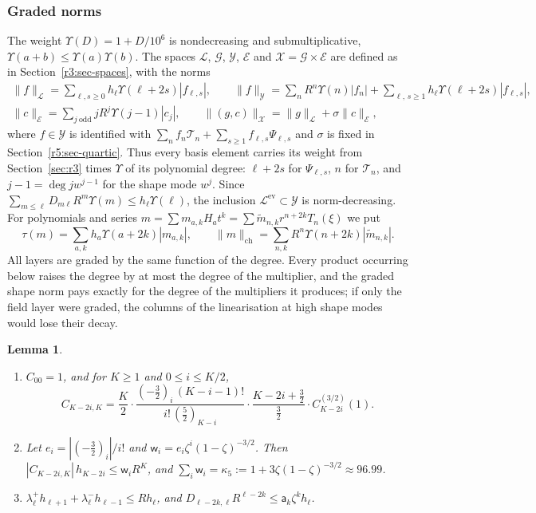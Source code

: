 \documentclass[11pt]{amsart}
\newtheorem{lemma}[theorem]{Lemma}
\theoremstyle{definition}
\theoremstyle{remark}
\numberwithin{equation}{section}
\newcommand{\Gc}{\mathcal{G}}
\newcommand{\nrm}[1]{\lVert #1\rVert}
\begin{document}
\subsubsection*{Graded norms}
The weight $\Upsilon(D)=1+D/10^6$ is nondecreasing and submultiplicative, $\Upsilon(a+b)\leq\Upsilon(a)\Upsilon(b)$. The spaces $\mathcal L$, $\Gc$, $\mathcal Y$, $\mathcal E$ and $\mathcal X=\Gc\times\mathcal E$ are defined as in Section~\ref{r3:sec-spaces}, with the norms
\begin{gather*}
\nrm f_{\mathcal L}=\sum_{\ell,s\geq0}h_\ell\Upsilon(\ell+2s)|f_{\ell,s}|,\qquad\nrm f_{\mathcal Y}=\sum_nR^n\Upsilon(n)|f_n|+\sum_{\ell,\,s\geq1}h_\ell\Upsilon(\ell+2s)|f_{\ell,s}|,\\
\nrm c_{\mathcal E}=\sum_{j\ \mathrm{odd}}jR^j\Upsilon(j-1)|c_j|,\qquad\nrm{(g,c)}_{\mathcal X}=\nrm g_{\mathcal L}+\sigma\nrm c_{\mathcal E},
\end{gather*}
where $f\in\mathcal Y$ is identified with $\sum_nf_n\mathcal T_n+\sum_{s\geq1}f_{\ell,s}\Psi_{\ell,s}$ and $\sigma$ is fixed in Section~\ref{r5:sec-quartic}. Thus every basis element carries its weight from Section~\ref{sec:r3} times $\Upsilon$ of its polynomial degree: $\ell+2s$ for $\Psi_{\ell,s}$, $n$ for $\mathcal T_n$, and $j-1=\deg jw^{j-1}$ for the shape mode $w^j$. Since $\sum_{m\leq\ell}D_{m\ell}R^m\Upsilon(m)\leq h_\ell\Upsilon(\ell)$, the inclusion $\mathcal L^{\mathrm{ev}}\subset\mathcal Y$ is norm-decreasing. For polynomials and series $m=\sum m_{a,k}H_at^k=\sum\tilde m_{n,k}r^{n+2k}T_n(\xi)$ we put
\[
\tau(m)=\sum_{a,k}h_a\Upsilon(a+2k)|m_{a,k}|,\qquad\nrm m_{\mathrm{ch}}=\sum_{n,k}R^n\Upsilon(n+2k)|\tilde m_{n,k}| .
\]
All layers are graded by the same function of the degree. Every product occurring below raises the degree by at most the degree of the multiplier, and the graded shape norm pays exactly for the degree of the multipliers it produces; if only the field layer were graded, the columns of the linearisation at high shape modes would lose their decay.

\begin{lemma}\label{r5:lem-conn}
\begin{enumerate}[label=\textup{(\alph*)}]
\item $C_{00}=1$, and for $K\geq1$ and $0\leq i\leq K/2$,
\[
C_{K-2i,K}=\frac K2\cdot\frac{(-\frac32)_i\,(K-i-1)!}{i!\,(\frac52)_{K-i}}\cdot\frac{K-2i+\frac32}{\frac32}\cdot C^{(3/2)}_{K-2i}(1).
\]
\item Let $e_i=|(-\frac32)_i|/i!$ and $\mathsf w_i=e_i\zeta^i(1-\zeta)^{-3/2}$. Then $|C_{K-2i,K}|\,h_{K-2i}\leq\mathsf w_iR^K$, and $\sum_i\mathsf w_i=\kappa_5:=1+3\zeta(1-\zeta)^{-3/2}\approx96.99$.
\item $\lambda^+_\ell h_{\ell+1}+\lambda^-_\ell h_{\ell-1}\leq Rh_\ell$, and $D_{\ell-2k,\ell}R^{\ell-2k}\leq\mathsf a_k\zeta^kh_\ell$.
\end{enumerate}
\end{lemma}
\end{document}
